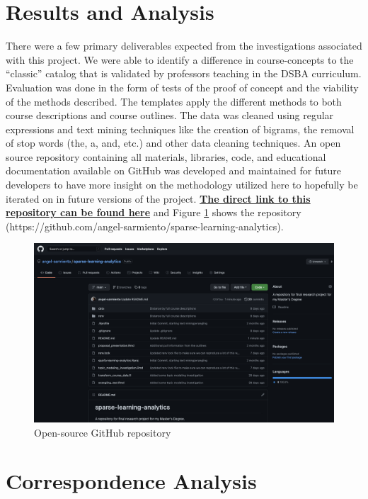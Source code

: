 \section{Results and Analysis}


There were a few primary deliverables expected from the investigations associated with this project. We were able to 
identify a difference in course-concepts to the “classic” catalog that is validated by professors teaching in the DSBA 
curriculum. Evaluation was done in the form of tests of the proof of concept and the viability of the methods described.  
The templates apply the different methods to both course descriptions and course outlines. The data was cleaned using 
regular expressions \cite{regex} and text mining techniques like the creation of bigrams, the removal of stop words 
(the, a, and, etc.) and other data cleaning techniques.  An open source repository containing all materials, libraries, 
code, and educational documentation available on GitHub was developed and maintained for future developers to have more 
insight on the methodology utilized here to hopefully be iterated on in future versions of the project.  
 \href{https://github.com/angel-sarmiento/sparse-learning-analytics}{\textbf{The direct link to this repository can be found here}} 
  and Figure \ref{fig:repo} shows the repository (https://github.com/angel-sarmiento/sparse-learning-analytics).  

\begin{figure}[H]
\centering

\includegraphics[width = 1\textwidth, height = .6\textheight]{Content/images/repo.png}
\caption{Open-source GitHub repository}
\label{fig:repo}
\end{figure}


\section{Correspondence Analysis}
\label{ca} 

